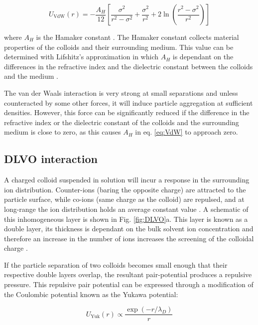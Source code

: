 \begin{equation}
U_{\textrm{VdW}}(r)=-\frac{A_{H}}{12}\left[\frac{\sigma^{2}}{r^{2}-\sigma^{2}}+\frac{\sigma^{2}}{r^{2}}+2 \ln \left(\frac{r^{2}-\sigma^{2}}{r^{2}}\right)\right]
	\label{eq:VdW}
\end{equation}

\noindent where $A_H$ is the Hamaker constant \cite{lekkerkerker2011}. The Hamaker constant collects material properties of the colloids and their surrounding medium. This value can be determined with Lifshitz's approximation in which $A_H$ is dependant on the differences in the refractive index and the dielectric constant between the colloids and the medium \cite{prieve1988}.

 The van der Waals interaction is very strong at small separations and unless counteracted by some other forces, it will induce particle aggregation at sufficient densities. However, this force can be significantly reduced if the difference in the refractive index or the dielectric constant of the colloids and the surrounding medium is close to zero, as this causes $A_H$ in eq. \ref{eq:VdW} to approach zero. 
 
 


\subsection{DLVO interaction}
A charged colloid suspended in solution will incur a response in the surrounding ion distribution. Counter-ions (baring the opposite charge) are attracted to the particle surface, while co-ions (same charge as the colloid) are repulsed, and at long-range the ion distribution holds an average constant value \cite{lekkerkerker2011}. A schematic of this inhomogeneous layer is shown in Fig. \ref{fig:DLVO}a. This layer is known as a double layer, its thickness is dependant on the bulk solvent ion concentration and therefore an increase in the number of ions increases the screening of the colloidal charge \cite{lekkerkerker2011}. 

If the particle separation of two colloids becomes small enough that their respective double layers overlap, the resultant pair-potential produces a repulsive pressure. This repulsive pair potential can be expressed through a modification of the Coulombic potential known as the Yukawa potential:

\begin{equation}
	U_{\textrm{Yuk}}(r) \propto \frac{\exp (-r / \lambda_D)}{r}
	\label{eq:Yuk}
\end{equation}

